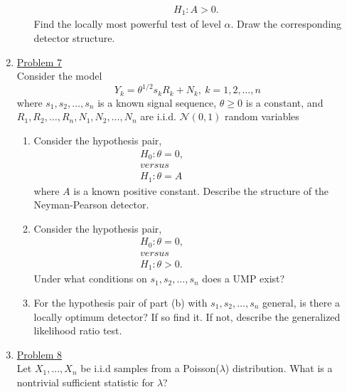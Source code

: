 \documentclass[a4paper,english,12pt]{article}
\begin{document}
\begin{enumerate}
\begin{enumerate}
\begin{gather*}
H_1: A>0.
\end{gather*}
Find the locally most powerful test of level $\alpha$. Draw the corresponding detector structure.
\end{enumerate}
\item  \hyperlink{solution7}{Problem 7}\\
Consider the model
\begin{equation}
Y_k=\theta^{1/2} s_kR_k+N_k,~k=1,2,\dots,n
\end{equation}
where $s_1,s_2,\dots,s_n$ is a known signal sequence, $\theta\geq0$ is a constant, and $R_1,R_2,\dots,R_n,N_1,N_2,\dots,N_n$ are i.i.d. $\mathcal{N}(0,1)$ random variables
\begin{enumerate}
\item Consider the hypothesis pair,
\begin{gather*}
H_0: \theta=0,\\
versus\hspace{100pt}\\
H_1: \theta=A
\end{gather*}
where $A$ is a known positive constant. Describe the structure of the Neyman-Pearson detector.
\item Consider the hypothesis pair,
\begin{gather*}
H_0: \theta=0,\\
versus\hspace{100pt}\\
H_1: \theta>0.
\end{gather*}
Under what conditions on $s_1,s_2,\dots,s_n$ does a UMP exist?
\item For the hypothesis pair of part (b) with $s_1,s_2,\dots,s_n$ general, is there a locally optimum detector? If so find it. If not, describe the generalized likelihood ratio test.
\end{enumerate}
\item \hyperlink{solution8}{Problem 8}\\
Let $X_1, ..., X_n$ be i.i.d samples from a Poisson($\lambda$) distribution. What is a nontrivial sufficient statistic for $\lambda$?
\end{enumerate}
\end{document}
